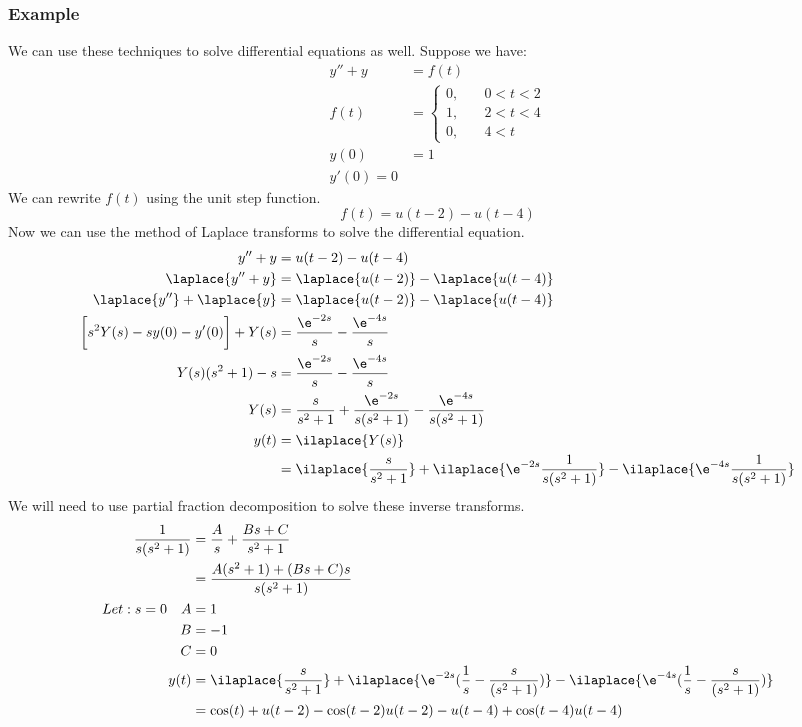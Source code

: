 \documentclass{math}
\begin{document}
\subsubsection*{Example}
We can use these techniques to solve differential equations as well. Suppose
we have:
\begin{align*}
  y''+y &= f(t) \\
  f(t) &= \begin{cases}
    0, &\quad 0<t<2 \\
    1, &\quad 2<t<4 \\
    0, &\quad 4<t
  \end{cases} \\
  y(0) &= 1 \\
  y'(0) = 0
\end{align*}
We can rewrite \( f(t) \) using the unit step function.
\[ f(t) = u(t-2)-u(t-4) \]
Now we can use the method of Laplace transforms to solve the differential
equation.
\begin{align*}
  y''+y &= u(t-2)-u(t-4) \\
  \laplace{y''+y} &= \laplace{u(t-2)}-\laplace{u(t-4)} \\
  \laplace{y''}+\laplace{y} &= \laplace{u(t-2)}-\laplace{u(t-4)} \\
  \bigg[s^2Y(s)-sy(0)-y'(0)\bigg]+Y(s) &=
    \frac{\e^{-2s}}{s}-\frac{\e^{-4s}}{s} \\
  Y(s)(s^2+1)-s &= \frac{\e^{-2s}}{s}-\frac{\e^{-4s}}{s} \\
  Y(s) &= \frac{s}{s^2+1}+\frac{\e^{-2s}}{s(s^2+1)}-\frac{\e^{-4s}}{s(s^2+1)} \\
  y(t) &= \ilaplace{Y(s)} \\
  &= \ilaplace{\frac{s}{s^2+1}}+\ilaplace{\e^{-2s}\frac{1}{s(s^2+1)}}-
    \ilaplace{\e^{-4s}\frac{1}{s(s^2+1)}}
\end{align*}
We will need to use partial fraction decomposition to solve these inverse
transforms.
\begin{align*}
  \frac{1}{s(s^2+1)} &= \frac{A}{s}+\frac{Bs+C}{s^2+1} \\
  &= \frac{A(s^2+1)+(Bs+C)s}{s(s^2+1)} \\
  Let: s = 0 \quad A &= 1 \\
  B &= -1 \\
  C &= 0 \\
  y(t) &= \ilaplace{\frac{s}{s^2+1}}+
    \ilaplace{\e^{-2s}(\frac{1}{s}-\frac{s}{(s^2+1)})}
    -\ilaplace{\e^{-4s}(\frac{1}{s}-\frac{s}{(s^2+1)})} \\
  &= \cos(t)+u(t-2)-\cos(t-2)u(t-2)-u(t-4)+\cos(t-4)u(t-4)
\end{align*}
\end{document}
